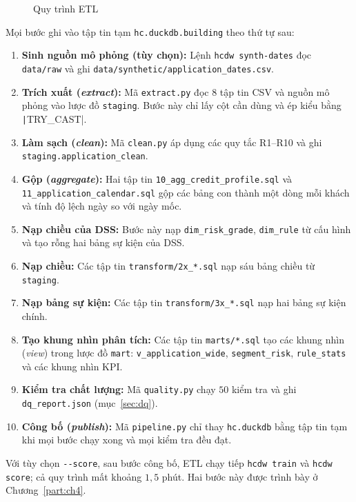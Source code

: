 \begin{figure}[H]
	\centering
	\caption{Quy trình ETL}
	\label{fig:etl_pipeline}
\end{figure}

Mọi bước ghi vào tập tin tạm \texttt{hc.duckdb.building} theo thứ tự sau:
\begin{enumerate}[topsep=0pt, itemsep=1pt]
	\item \textbf{Sinh nguồn mô phỏng (tùy chọn):} Lệnh \texttt{hcdw synth-dates} đọc \texttt{data/raw} và ghi \texttt{data/synthetic/application\_dates.csv}.
	\item \textbf{Trích xuất (\textit{extract}):} Mã \texttt{extract.py} đọc $8$ tập tin CSV và nguồn mô phỏng vào lược đồ \texttt{staging}. Bước này chỉ lấy cột cần dùng và ép kiểu bằng \texttt|TRY_CAST|.
	\item \textbf{Làm sạch (\textit{clean}):} Mã \texttt{clean.py} áp dụng các quy tắc R1--R10 và ghi \texttt{staging.application\_clean}.
	\item \textbf{Gộp (\textit{aggregate}):} Hai tập tin \texttt{10\_agg\_credit\_profile.sql} và \texttt{11\_application\_calendar.sql} gộp các bảng con thành một dòng mỗi khách và tính độ lệch ngày so với ngày mốc.
	\item \textbf{Nạp chiều của DSS:} Bước này nạp \texttt{dim\_risk\_grade}, \texttt{dim\_rule} từ cấu hình và tạo rỗng hai bảng sự kiện của DSS.
	\item \textbf{Nạp chiều:} Các tập tin \texttt{transform/2x\_*.sql} nạp sáu bảng chiều từ \texttt{staging}.
	\item \textbf{Nạp bảng sự kiện:} Các tập tin \texttt{transform/3x\_*.sql} nạp hai bảng sự kiện chính.
	\item \textbf{Tạo khung nhìn phân tích:} Các tập tin \texttt{marts/*.sql} tạo các khung nhìn (\textit{view}) trong lược đồ \texttt{mart}: \texttt{v\_application\_wide}, \texttt{segment\_risk}, \texttt{rule\_stats} và các khung nhìn KPI.
	\item \textbf{Kiểm tra chất lượng:} Mã \texttt{quality.py} chạy $50$ kiểm tra và ghi \texttt{dq\_report.json} (mục~\ref{sec:dq}).
	\item \textbf{Công bố (\textit{publish}):} Mã \texttt{pipeline.py} chỉ thay \texttt{hc.duckdb} bằng tập tin tạm khi mọi bước chạy xong và mọi kiểm tra đều đạt.
\end{enumerate}
Với tùy chọn \texttt{-{}-score}, sau bước công bố, ETL chạy tiếp \texttt{hcdw train} và \texttt{hcdw score}; cả quy trình mất khoảng $1{,}5$ phút. Hai bước này được trình bày ở Chương~\ref{part:ch4}.

